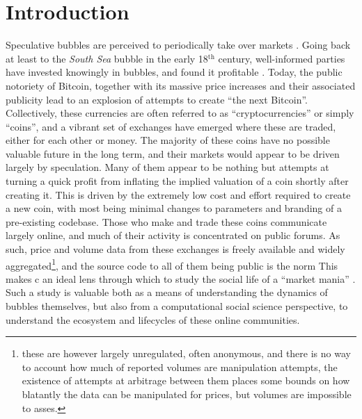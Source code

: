 \section{Introduction}

Speculative bubbles are perceived to periodically take over markets \cite{garber2001famous}.
Going back at least to the \emph{South Sea} bubble in the early 18$^{\text{th}}$ century, well-informed parties  have invested knowingly in bubbles, and found it profitable \cite{temin2004riding}.
Today, the public notoriety of Bitcoin, together with its massive price increases and their associated publicity lead to an explosion of attempts to create ``the next Bitcoin''.
Collectively, these currencies are often referred to as ``cryptocurrencies'' or simply ``coins'', and a vibrant set of exchanges have emerged where these are traded, either for each other or money.
The majority of these coins have no possible valuable future in the long term, and their markets would appear to be driven largely by speculation.
Many of them appear to be nothing but attempts at turning a quick profit from inflating the implied valuation of a coin shortly after creating it.
This is driven by the extremely low cost and effort required to create a new coin, with most being minimal changes to parameters and branding of a pre-existing codebase.
Those who make and trade these coins communicate largely online, and much of their activity is concentrated on public forums. 
As such, price and volume data from these exchanges is freely available and widely aggregated\footnote{ these are however largely unregulated, often anonymous, and there is no way to account how much of reported volumes are manipulation attempts, the existence of attempts at arbitrage between them places some bounds on how blatantly the data can be manipulated for prices, but volumes are impossible to asses. }, and the source code to all of them being public is the norm%
This makes c
an ideal lens through which to study the social life of a ``market mania'' \cite{cosma2008}.
Such a study is valuable both as a means of understanding the dynamics of bubbles themselves, but also from a computational social science perspective, to understand the ecosystem and lifecycles of these online communities.


